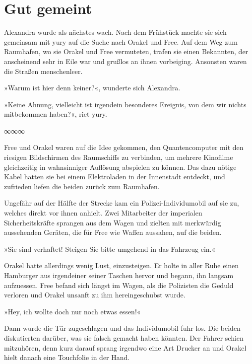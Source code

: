 \chapter{Gut gemeint}

Alexandra wurde als nächstes wach. Nach dem Frühstück machte sie sich gemeinsam mit yury auf die Suche nach Orakel und Free. Auf dem Weg zum Raumhafen, wo sie Orakel und Free vermuteten, trafen sie einen Bekannten, der anscheinend sehr in Eile war und grußlos an ihnen vorbeiging. Ansonsten waren die Straßen menschenleer.

»Warum ist hier denn keiner?«, wunderte sich Alexandra.

»Keine Ahnung, vielleicht ist irgendein besonderes Ereignis, von dem wir nichts mitbekommen haben?«, riet yury.

\begin{center}
    ∞∞∞
\end{center}

Free und Orakel waren auf die Idee gekommen, den Quantencomputer mit den riesigen Bildschirmen des Raumschiffs zu verbinden, um mehrere Kinofilme gleichzeitig in wahnsinniger Auflösung abspielen zu können. Das dazu nötige Kabel hatten sie bei einem Elektroladen in der Innenstadt entdeckt, und zufrieden liefen die beiden zurück zum Raumhafen.

Ungefähr auf der Hälfte der Strecke kam ein Polizei-Individumobil auf sie zu, welches direkt vor ihnen anhielt. Zwei Mitarbeiter der imperialen Sicherheitskräfte sprangen aus dem Wagen und zielten mit merkwürdig aussehenden Geräten, die für Free wie Waffen aussahen, auf die beiden.

»Sie sind verhaftet! Steigen Sie bitte umgehend in das Fahrzeug ein.«

Orakel hatte allerdings wenig Lust, einzusteigen. Er holte in aller Ruhe einen Hamburger aus irgendeiner seiner Taschen hervor und begann, ihn langsam aufzuessen. Free befand sich längst im Wagen, als die Polizisten die Geduld verloren und Orakel unsanft zu ihm hereingeschubst wurde.

»Hey, ich wollte doch nur noch etwas essen!«

Dann wurde die Tür zugeschlagen und das Individumobil fuhr los. Die beiden diskutierten darüber, was sie falsch gemacht haben könnten. Der Fahrer schien mitzuhören, denn kurz darauf sprang irgendwo eine Art Drucker an und Orakel hielt danach eine Touchfolie in der Hand.

